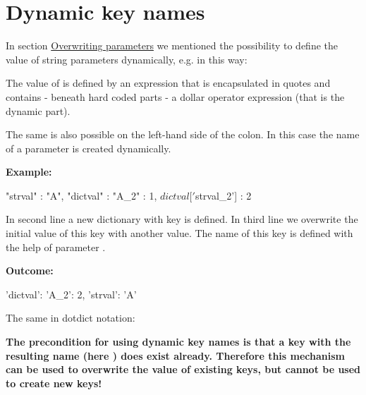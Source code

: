 \section{Dynamic key names}

In section \hyperref[overwriting-parameters]{Overwriting parameters} we mentioned the possibility to define the value of string parameters dynamically, e.g. in this way:


The value of  is defined by an expression that is encapsulated in quotes and contains - beneath hard coded parts - a dollar operator expression
(that is the dynamic part).

The same is also possible on the left-hand side of the colon. In this case the name of a parameter is created dynamically.

\vspace{2ex}

\textbf{Example:}

\begin{pythoncode}
"strval"  : "A",
"dictval" : {"A_2" : 1},
${dictval}['${strval}_2'] : 2
\end{pythoncode}

In second line a new dictionary with key  is defined. In third line we overwrite the initial value of this key with another value.
The name of this key is defined with the help of parameter .

\vspace{2ex}

\textbf{Outcome:}

\begin{pythonlog}
{'dictval': {'A_2': 2}, 'strval': 'A'}
\end{pythonlog}

\vspace{2ex}

The same in dotdict notation:

\vspace{2ex}


\textbf{The precondition for using dynamic key names is that a key with the resulting name (here ) does exist already.
Therefore this mechanism can be used to overwrite the value of existing keys, but cannot be used to create new keys!}

